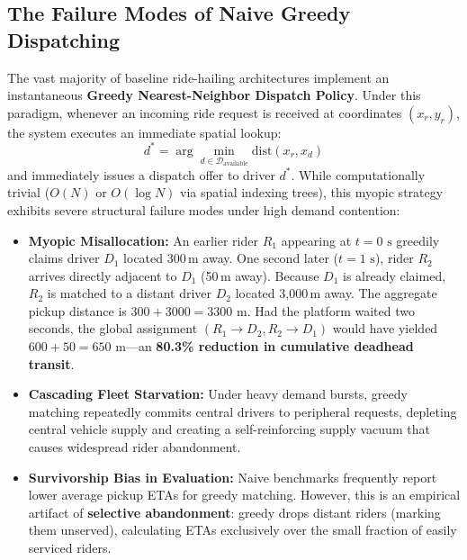 \documentclass[11pt,a4paper]{article}
\begin{document}
\subsection{The Failure Modes of Naive Greedy Dispatching}
The vast majority of baseline ride-hailing architectures implement an instantaneous \textbf{Greedy Nearest-Neighbor Dispatch Policy}. Under this paradigm, whenever an incoming ride request is received at coordinates $(x_r, y_r)$, the system executes an immediate spatial lookup:
\begin{equation}
    d^* = \arg\min_{d \in \mathcal{D}_{\text{available}}} \text{dist}(x_r, x_d)
\end{equation}
and immediately issues a dispatch offer to driver $d^*$. While computationally trivial ($O(N)$ or $O(\log N)$ via spatial indexing trees), this myopic strategy exhibits severe structural failure modes under high demand contention:
\begin{itemize}[leftmargin=1.5em]
    \item \textbf{Myopic Misallocation:} An earlier rider $R_1$ appearing at $t = 0\text{ s}$ greedily claims driver $D_1$ located 300\,m away. One second later ($t = 1\text{ s}$), rider $R_2$ arrives directly adjacent to $D_1$ (50\,m away). Because $D_1$ is already claimed, $R_2$ is matched to a distant driver $D_2$ located 3,000\,m away. The aggregate pickup distance is $300 + 3000 = 3300\text{ m}$. Had the platform waited two seconds, the global assignment $(R_1 \to D_2, R_2 \to D_1)$ would have yielded $600 + 50 = 650\text{ m}$---an \textbf{80.3\% reduction in cumulative deadhead transit}.
    \item \textbf{Cascading Fleet Starvation:} Under heavy demand bursts, greedy matching repeatedly commits central drivers to peripheral requests, depleting central vehicle supply and creating a self-reinforcing supply vacuum that causes widespread rider abandonment.
    \item \textbf{Survivorship Bias in Evaluation:} Naive benchmarks frequently report lower average pickup ETAs for greedy matching. However, this is an empirical artifact of \textbf{selective abandonment}: greedy drops distant riders (marking them unserved), calculating ETAs exclusively over the small fraction of easily serviced riders.
\end{itemize}
\end{document}
